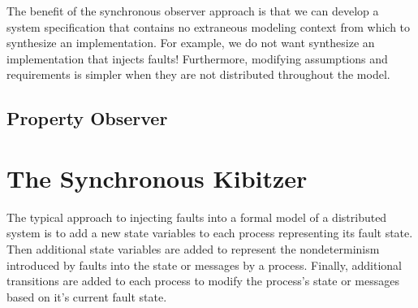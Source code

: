 \documentclass{IEEEtran/IEEEtran}
\newcommand{\lee}[1]{ } %
\newcommand{\lee}[1]{ {\color{blue}$<$lee: #1$>$} } %
\begin{document}
The benefit of the synchronous observer approach is that we can develop a system specification that contains no extraneous modeling context from which to synthesize an implementation. For example, we do not want synthesize an implementation that injects faults! Furthermore, modifying assumptions and requirements is simpler when they are not distributed throughout the model.






\subsection{Property Observer}

\lee{todo}

\section{The Synchronous Kibitzer}\label{sec:kibitzer}
The typical approach to injecting faults into a formal model of a distributed system is to add a new state variables to each process representing its fault state. Then additional state variables are added to represent the nondeterminism introduced by faults into the state or messages by a process. Finally, additional transitions are added to each process to modify the process's state or messages based on it's current fault state.
\end{document}
